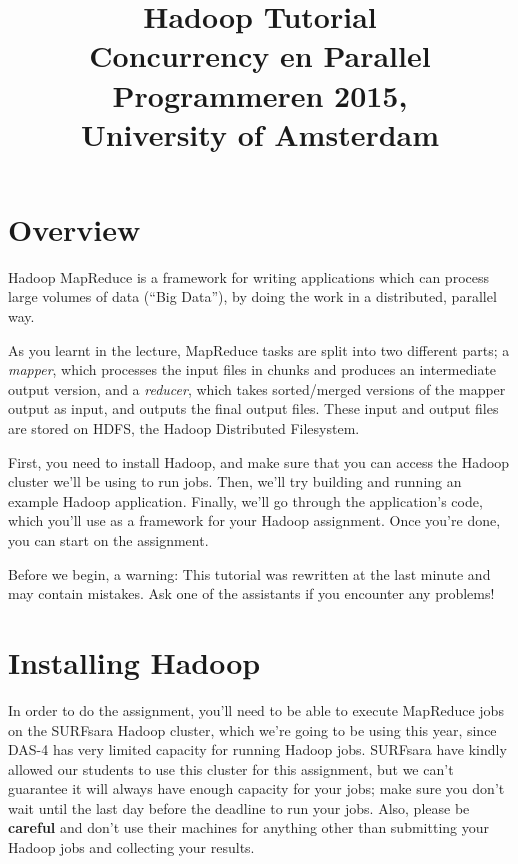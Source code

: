 \documentclass[a4paper,11pt]{article}
\date{}
\title{Hadoop Tutorial\\
  Concurrency en Parallel Programmeren 2015,\\
  University of Amsterdam
}
\begin{document}
  \maketitle
  
  \tableofcontents
  
  \section{Overview}
  
  Hadoop MapReduce is a framework for writing applications which can process large volumes of data (``Big Data''), by doing the work in a distributed,
  parallel way.

  As you learnt in the lecture, MapReduce tasks are split into two different parts; a \emph{mapper}, which processes the input files in chunks and
  produces an intermediate output version, and a \emph{reducer}, which takes sorted/merged versions of the mapper output as input, and outputs
  the final output files. These input and output files are stored on HDFS, the Hadoop Distributed Filesystem.

  First, you need to install Hadoop, and make sure that you can access the Hadoop cluster we'll be using to run jobs.
  Then, we'll try building and running an example Hadoop application. Finally, we'll go through the application's code, which
  you'll use as a framework for your Hadoop assignment. Once you're done, you can start on the assignment.

  Before we begin, a warning: This tutorial was rewritten at the last minute and may contain mistakes. Ask one of the assistants
  if you encounter any problems!

  \pagebreak
  \section{Installing Hadoop}

  In order to do the assignment, you'll need to be able to execute MapReduce jobs on the SURFsara Hadoop cluster, which we're going to be using
  this year, since DAS-4 has very limited capacity for running Hadoop jobs. SURFsara have kindly allowed our students to use this cluster for this
  assignment, but we can't guarantee it will always have enough capacity for your jobs; make sure you don't wait until the last day before the
  deadline to run your jobs. Also, please be \textbf{careful} and don't use their machines for anything other than submitting your Hadoop jobs
  and collecting your results.
\end{document}
